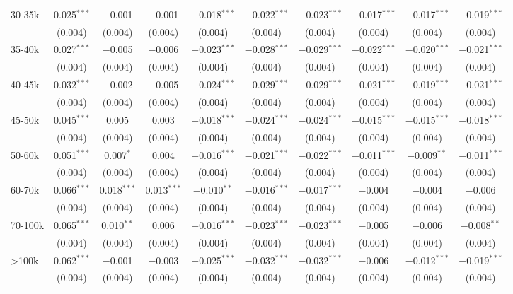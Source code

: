 \begin{table}[!htbp]
\begin{tabular}{@{\extracolsep{5pt}}lccccccccc}
  30-35k & 0.025$^{***}$ & $-$0.001 & $-$0.001 & $-$0.018$^{***}$ & $-$0.022$^{***}$ & $-$0.023$^{***}$ & $-$0.017$^{***}$ & $-$0.017$^{***}$ & $-$0.019$^{***}$ \\ 
  & (0.004) & (0.004) & (0.004) & (0.004) & (0.004) & (0.004) & (0.004) & (0.004) & (0.004) \\ 
  35-40k & 0.027$^{***}$ & $-$0.005 & $-$0.006 & $-$0.023$^{***}$ & $-$0.028$^{***}$ & $-$0.029$^{***}$ & $-$0.022$^{***}$ & $-$0.020$^{***}$ & $-$0.021$^{***}$ \\ 
  & (0.004) & (0.004) & (0.004) & (0.004) & (0.004) & (0.004) & (0.004) & (0.004) & (0.004) \\ 
  40-45k & 0.032$^{***}$ & $-$0.002 & $-$0.005 & $-$0.024$^{***}$ & $-$0.029$^{***}$ & $-$0.029$^{***}$ & $-$0.021$^{***}$ & $-$0.019$^{***}$ & $-$0.021$^{***}$ \\ 
  & (0.004) & (0.004) & (0.004) & (0.004) & (0.004) & (0.004) & (0.004) & (0.004) & (0.004) \\ 
  45-50k & 0.045$^{***}$ & 0.005 & 0.003 & $-$0.018$^{***}$ & $-$0.024$^{***}$ & $-$0.024$^{***}$ & $-$0.015$^{***}$ & $-$0.015$^{***}$ & $-$0.018$^{***}$ \\ 
  & (0.004) & (0.004) & (0.004) & (0.004) & (0.004) & (0.004) & (0.004) & (0.004) & (0.004) \\ 
  50-60k & 0.051$^{***}$ & 0.007$^{*}$ & 0.004 & $-$0.016$^{***}$ & $-$0.021$^{***}$ & $-$0.022$^{***}$ & $-$0.011$^{***}$ & $-$0.009$^{**}$ & $-$0.011$^{***}$ \\ 
  & (0.004) & (0.004) & (0.004) & (0.004) & (0.004) & (0.004) & (0.004) & (0.004) & (0.004) \\ 
  60-70k & 0.066$^{***}$ & 0.018$^{***}$ & 0.013$^{***}$ & $-$0.010$^{**}$ & $-$0.016$^{***}$ & $-$0.017$^{***}$ & $-$0.004 & $-$0.004 & $-$0.006 \\ 
  & (0.004) & (0.004) & (0.004) & (0.004) & (0.004) & (0.004) & (0.004) & (0.004) & (0.004) \\ 
  70-100k & 0.065$^{***}$ & 0.010$^{**}$ & 0.006 & $-$0.016$^{***}$ & $-$0.023$^{***}$ & $-$0.023$^{***}$ & $-$0.005 & $-$0.006 & $-$0.008$^{**}$ \\ 
  & (0.004) & (0.004) & (0.004) & (0.004) & (0.004) & (0.004) & (0.004) & (0.004) & (0.004) \\ 
  >100k & 0.062$^{***}$ & $-$0.001 & $-$0.003 & $-$0.025$^{***}$ & $-$0.032$^{***}$ & $-$0.032$^{***}$ & $-$0.006 & $-$0.012$^{***}$ & $-$0.019$^{***}$ \\ 
  & (0.004) & (0.004) & (0.004) & (0.004) & (0.004) & (0.004) & (0.004) & (0.004) & (0.004) \\ 

\end{tabular}
\end{table}
